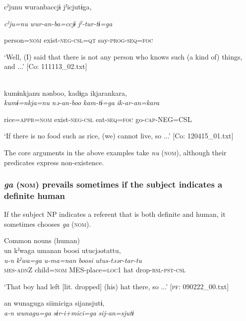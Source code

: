       cˀjunu  wuranbaccjɨ  jˀicjutɨga,

      \textit{cˀju=nu}  \textit{wur-an-ba=ccjɨ}  \textit{jˀ-tur-tɨ=ga}

      person=\textsc{nom}  exist-\textsc{neg}-\textsc{csl}=\textsc{qt}  say-\textsc{prog}-\textsc{seq}=\textsc{foc}

\glt ‘Well, (I) said that there is not any person who knows such (a kind of) things, and ...’ [Co: 111113\_02.txt]
\z

 \ex\relax[= (6-48 a)]\\
{\TM}
\gll  kumɨnkjanu  nənboo,  kadɨga  ikjarankara,\\

      \textit{kumɨ=nkja=nu}  \textit{nə-an-boo}  \textit{kam-tɨ=ga}  \textit{ik-ar-an=kara}

      rice=\textsc{appr}=\textsc{nom}  exist-\textsc{neg}-\textsc{csl}  eat-\textsc{seq}=\textsc{foc}  go-\textsc{cap}-NEG=CSL

\glt ‘If there is no food such as rice, (we) cannot live, so ...’ [Co: 120415\_01.txt]
\z

The core arguments in the above examples take \textit{nu} (\textsc{nom}), although their predicates express non-existence.

\subsubsection{\textit{ga} (\textsc{nom}) prevails sometimes if the subject indicates a definite human}

If the subject NP indicates a referent that is both definite and human, it sometimes chooses \textit{ga} (\textsc{nom}).

\ea\label{ex:6-132}
 Common nouns (human)\\

 \ea {\TM}  un  kˀwaga  umanan  {\textbar}boosi{\textbar}  utucjəətattu,\\
\gll \textit{u-n}  \textit{kˀwa=ga}  \textit{u-ma=nan}  \textit{boosi}  \textit{utus-təər-tar-tu}\\

      \textsc{mes}-\textsc{adn}Z  child=\textsc{nom}  MES-place=\textsc{loc}1  hat  drop-\textsc{rsl}-\textsc{pst}-\textsc{csl}

\glt ‘That boy had left [lit. dropped] (his) hat there, so ...’ [\textsc{pf}: 090222\_00.txt]
\z

 \ex {\TM}  an  wunaguga  siimiciga  sijansjutɨ,\\
\gll \textit{a-n}  \textit{wunagu=ga}  \textit{sɨr-i+mici=ga}  \textit{sij-an=sjutɨ}\\

